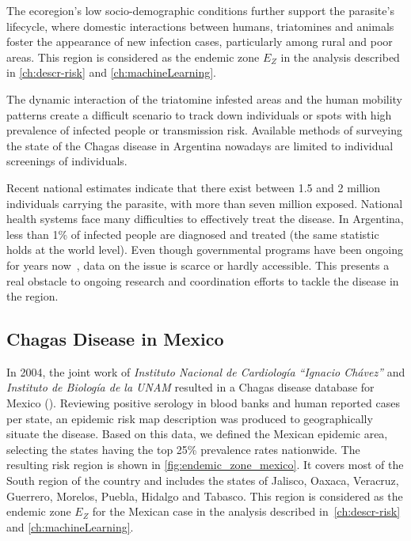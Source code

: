 The ecoregion's low socio-demographic conditions further support the parasite's lifecycle, where domestic interactions between humans, triatomines and animals foster the appearance of new infection cases, particularly among rural and poor areas.
This region is considered as the endemic zone $E_Z$ in the analysis described in \cref{ch:descr-risk} and \cref{ch:machineLearning}.




The dynamic interaction of the triatomine infested areas and the human mobility patterns create a difficult scenario to track down individuals or spots with high prevalence of infected people or transmission risk. Available methods of surveying the state of the Chagas disease in Argentina nowadays are limited to individual screenings of individuals. %

Recent national estimates indicate that there exist between 1.5 and 2 million individuals carrying the parasite, with more than seven million exposed. National health systems face many difficulties to effectively treat the disease.
In Argentina, less than 1\% of infected people are diagnosed and treated
(the same statistic holds at the world level).
Even though governmental programs have been ongoing for years now~\cite{plan_nacional_chagas}, data on the issue is scarce or hardly accessible. This presents a real obstacle to ongoing research and coordination efforts to tackle the disease in the region.


\subsection{Chagas Disease in  Mexico}\label{endemic_zone_mexico}



In 2004, the joint work of \textit{Instituto Nacional de Cardiología ``Ignacio Chávez''} and  \textit{Instituto de Biología de la UNAM} resulted in a Chagas disease database for Mexico (\cite{cruz2006chagmex}). Reviewing positive serology in blood banks and human reported cases per state, an epidemic risk map description was produced to geographically situate the disease. Based on this data, we defined the Mexican epidemic area, selecting the states having the top 25\% prevalence rates nationwide. The resulting risk region is shown in \cref{fig:endemic_zone_mexico}. It covers most of the South region of the country and includes the states of Jalisco, Oaxaca, Veracruz, Guerrero, Morelos, Puebla, Hidalgo and Tabasco.
This region is considered as the endemic zone $E_Z$ for the Mexican case in the analysis described in~\cref{ch:descr-risk} and \cref{ch:machineLearning}.

